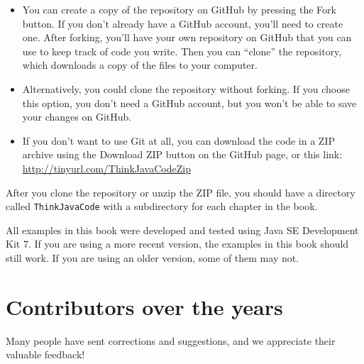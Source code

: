 \documentclass[12pt]{book}
\theoremstyle{exercise}
\begin{document}
\begin{itemize}

\item You can create a copy of the repository on GitHub by pressing the {\sf Fork} button.
If you don't already have a GitHub account, you'll need to create one.
After forking, you'll have your own repository on GitHub that you can use to keep track of code you write.
Then you can ``clone'' the repository, which downloads a copy of the files to your computer.

\item Alternatively, you could clone the repository without forking.
If you choose this option, you don't need a GitHub account, but you won't be able to save your changes on GitHub.

\item If you don't want to use Git at all, you can download the code in a ZIP archive using the {\sf Download ZIP} button on the GitHub page, or this link: \url{http://tinyurl.com/ThinkJavaCodeZip}

\end{itemize}

After you clone the repository or unzip the ZIP file, you should have a directory called {\tt ThinkJavaCode} with a subdirectory for each chapter in the book.

All examples in this book were developed and tested using Java SE Development Kit 7.
If you are using a more recent version, the examples in this book should still work.
If you are using an older version, some of them may not.


\section*{Contributors over the years}


Many people have sent corrections and suggestions, and we appreciate their valuable feedback!
\end{document}
